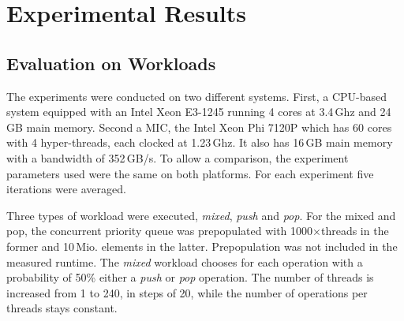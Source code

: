 \section{Experimental Results}
\label{sec:exp}
\subsection{Evaluation on Workloads}
The experiments were conducted on two different systems. First, a CPU-based system equipped with an Intel Xeon E3-1245 running 4 cores at 3.4\,Ghz and 24\,GB main memory. Second a MIC, the Intel Xeon Phi 7120P which has 60 cores with 4 hyper-threads, each clocked at 1.23\,Ghz. It also has 16\,GB main memory with a bandwidth of 352\,GB/s. To allow a comparison, the experiment parameters used were the same on both platforms. For each experiment five iterations were averaged. %

Three types of workload were executed, \textit{mixed}, \textit{push} and \textit{pop}. For the mixed and pop, the concurrent priority queue was prepopulated with 1000$\times$threads in the former and 10\,Mio. elements in the latter. Prepopulation was not included in the measured runtime. The \textit{mixed} workload chooses for each operation with a probability of 50\% either a \textit{push} or \textit{pop} operation. The number of threads is increased from 1 to 240, in steps of 20, while the number of operations per threads stays constant.

